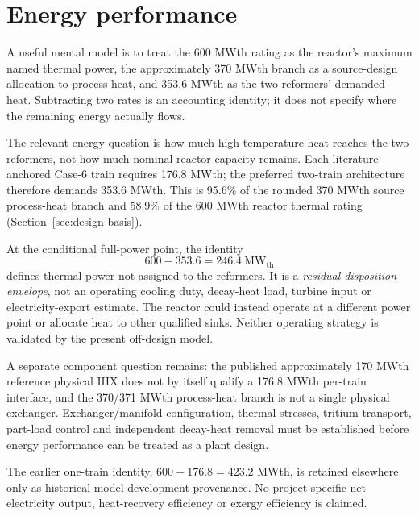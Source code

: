 \section{Energy performance}\label{sec:energy-performance}

A useful mental model is to treat the 600 MWth rating as the reactor's maximum named thermal power, the approximately 370 MWth branch as a source-design allocation to process heat, and 353.6 MWth as the two reformers' demanded heat. Subtracting two rates is an accounting identity; it does not specify where the remaining energy actually flows.

The relevant energy question is how much high-temperature heat reaches the two reformers, not how much nominal reactor capacity remains. Each literature-anchored Case-6 train requires 176.8 MWth; the preferred two-train architecture therefore demands 353.6 MWth. This is 95.6\% of the rounded 370 MWth source process-heat branch and 58.9\% of the 600 MWth reactor thermal rating (Section~\ref{sec:design-basis}).

\ThermalAllocationFigure

At the conditional full-power point, the identity
\[
600-353.6=246.4~\mathrm{MW_{th}}
\]
defines thermal power not assigned to the reformers. It is a \emph{residual-disposition envelope}, not an operating cooling duty, decay-heat load, turbine input or electricity-export estimate. The reactor could instead operate at a different power point or allocate heat to other qualified sinks. Neither operating strategy is validated by the present off-design model.

A separate component question remains: the published approximately 170 MWth reference physical IHX does not by itself qualify a 176.8 MWth per-train interface, and the 370/371 MWth process-heat branch is not a single physical exchanger. Exchanger/manifold configuration, thermal stresses, tritium transport, part-load control and independent decay-heat removal must be established before energy performance can be treated as a plant design.

The earlier one-train identity, $600-176.8=423.2$ MWth, is retained elsewhere only as historical model-development provenance. No project-specific net electricity output, heat-recovery efficiency or exergy efficiency is claimed.
